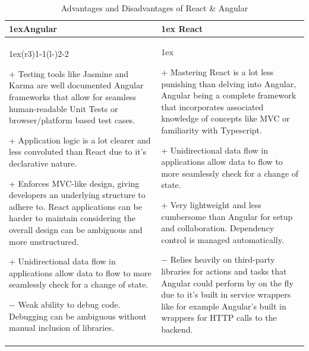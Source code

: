 \begin{table}[H]
\begin{tabularx}{\linewidth}{>{\parskip1ex}X@{\kern4\tabcolsep}>{\parskip1ex}X}
\toprule
\hfil\bfseries Angular
&
\hfil\bfseries React
\\\cmidrule(r{3\tabcolsep}){1-1}\cmidrule(l{-\tabcolsep}){2-2}

\begin{compactitem}[-]
\item[+] Testing tools like Jasmine and Karma are well documented Angular frameworks that allow for seamless human-readable Unit Tests or browser/platform based test cases.
\item[+] Application logic is a lot clearer and less convoluted than React due to it's declarative nature.
\item[+] Enforces MVC-like design, giving developers an underlying structure to adhere to. React applications can be harder to maintain considering the overall design can be ambiguous and more unstructured.
\item[+] Unidirectional data flow in applications allow data to flow to more seamlessly check for a change of state.
\item[$-$] Weak ability to debug code. Debugging can be ambiguous without manual inclusion of libraries.
\end{compactitem}
\par

&

\begin{compactitem}[-]
\item[+] Mastering React is a lot less punishing than delving into Angular, Angular being a complete framework that incorporates associated knowledge of concepts like MVC or familiarity with Typescript.
\item[+] Unidirectional data flow in applications allow data to flow to more seamlessly check for a change of state.
\item[+] Very lightweight and less cumbersome than Angular for setup and collaboration. Dependency control is managed automatically.
\item[$-$] Relies heavily on third-party libraries for actions and tasks that Angular could perform by on the fly due to it's built in service wrappers like for example Angular's built in wrappers for HTTP calls to the backend. 
\end{compactitem}

\\\bottomrule
\end{tabularx}
\caption{Advantages and Disadvantages of React \& Angular}
\end{table}

